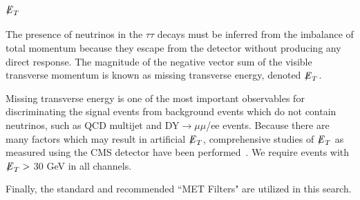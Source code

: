 \subsection{\texorpdfstring{${\not\mathrel{E}}_T$}{Missing transverse energy}}\label{ss:met}

The presence of neutrinos in the $\tau\tau$ decays must be inferred from the imbalance of total momentum because they escape from the detector without producing 
any direct response. The magnitude of the negative vector sum of the visible transverse momentum is known as missing transverse energy, denoted ${\not\mathrel{E}}_T$.

Missing transverse energy is one of the most important observables for discriminating the signal events from background events which do not contain neutrinos, 
such as QCD multijet and DY$\to\mu\mu$/ee events.
Because there are many factors which may result in artificial ${\not\mathrel{E}}_T$, comprehensive studies of ${\not\mathrel{E}}_T$ as measured using the CMS detector have been 
performed~\cite{MET}. We require events with ${\not\mathrel{E}}_T >$ 30 GeV in all channels.

Finally, the standard and recommended ``MET Filters" are utilized in this search.

